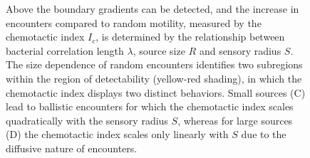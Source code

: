 \documentclass[9pt,twocolumn,twoside]{pnas-new}
\begin{document}
\begin{figure}
{        %
        Above the boundary gradients can be detected, and the increase in encounters compared to random motility, measured by the chemotactic index $I_c$, is determined by the relationship between bacterial correlation length $\lambda$, source size $R$ and sensory radius $S$.
        The size dependence of random encounters identifies two subregions within the region of detectability (yellow-red shading), in which the chemotactic index displays two distinct behaviors.
        Small sources (C) lead to ballistic encounters for which the chemotactic index scales quadratically with the sensory radius $S$, whereas for large sources (D) the chemotactic index scales only linearly with $S$ due to the diffusive nature of encounters.
    }
    \label{fig:sensing}
\end{figure}
\end{document}

